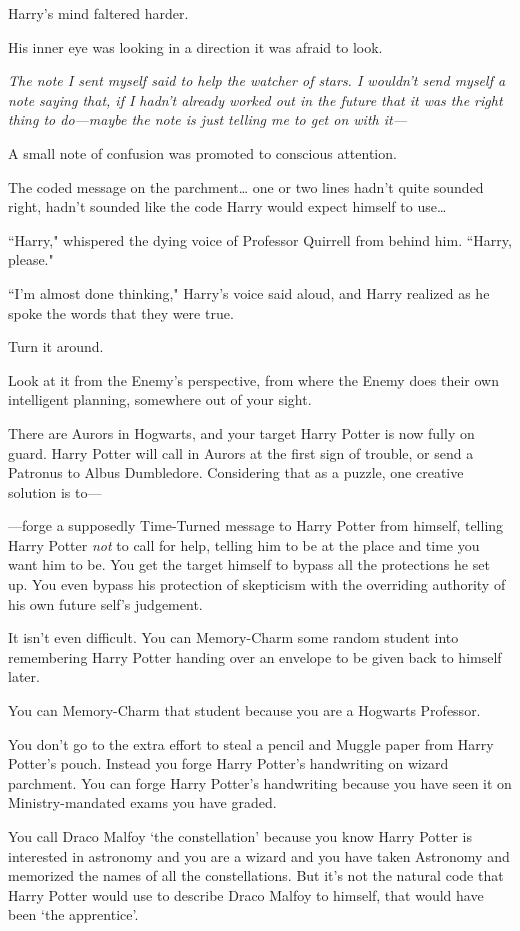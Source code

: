 Harry's mind faltered harder.

His inner eye was looking in a direction it was afraid to look.

\emph{The note I sent myself said to help the watcher of stars. I wouldn't send myself a note saying that, if I hadn't already worked out in the future that it was the right thing to do—maybe the note is just telling me to get on with it—}

A small note of confusion was promoted to conscious attention.

The coded message on the parchment{\ldots} one or two lines hadn't quite sounded right, hadn't sounded like the code Harry would expect himself to use{\ldots}

``Harry," whispered the dying voice of Professor Quirrell from behind him. ``Harry, please."

``I'm almost done thinking," Harry's voice said aloud, and Harry realized as he spoke the words that they were true.

Turn it around.

Look at it from the Enemy's perspective, from where the Enemy does their own intelligent planning, somewhere out of your sight.

There are Aurors in Hogwarts, and your target Harry Potter is now fully on guard. Harry Potter will call in Aurors at the first sign of trouble, or send a Patronus to Albus Dumbledore. Considering that as a puzzle, one creative solution is to—

—forge a supposedly Time-Turned message to Harry Potter from himself, telling Harry Potter \emph{not} to call for help, telling him to be at the place and time you want him to be. You get the target himself to bypass all the protections he set up. You even bypass his protection of skepticism with the overriding authority of his own future self's judgement.

It isn't even difficult. You can Memory-Charm some random student into remembering Harry Potter handing over an envelope to be given back to himself later.

You can Memory-Charm that student because you are a Hogwarts Professor.

You don't go to the extra effort to steal a pencil and Muggle paper from Harry Potter's pouch. Instead you forge Harry Potter's handwriting on wizard parchment. You can forge Harry Potter's handwriting because you have seen it on Ministry-mandated exams you have graded.

You call Draco Malfoy `the constellation' because you know Harry Potter is interested in astronomy and you are a wizard and you have taken Astronomy and memorized the names of all the constellations. But it's not the natural code that Harry Potter would use to describe Draco Malfoy to himself, that would have been `the apprentice'.

